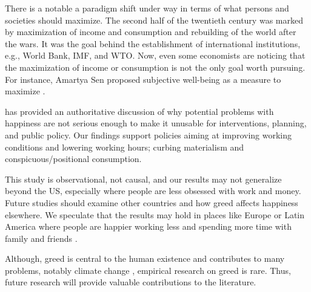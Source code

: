\documentclass[10pt, letterpaper]{article}
\begin{document}
\begin{spacing}{1.8}
There is a notable a paradigm shift under way in terms of what persons and
societies should maximize. The second half of the twentieth century was marked
by maximization of income and consumption and rebuilding of the world after the
wars. It was the goal behind the establishment of international institutions,
e.g., World Bank, IMF, and WTO. Now, even some economists are noticing that the maximization of income or consumption is not the only goal worth pursuing. For instance, Amartya Sen proposed subjective well-being as a measure to maximize \citep{stiglitz09al}. 

\citet{diener09} has provided an authoritative  
discussion of why potential problems with happiness are not serious enough to make it unusable for interventions, planning, and public policy.  
%
Our findings support policies aiming at improving working conditions and lowering working hours; curbing materialism and conspicuous/positional consumption. 

This study is observational, not causal, and our results may not generalize beyond the US, especially where people are less obsessed with work and money. 
%
Future studies should examine other countries and how greed affects happiness
elsewhere. We speculate that the results may hold in places like Europe or Latin America where people are happier working less and spending more time with family and friends \citep{valente16,valente15,aokditella}.  

Although, greed is central to the human existence and contributes to many problems, notably climate change \citep[e.g.,][]{okulicz19}, empirical research on greed is rare. Thus, future research will provide valuable contributions to the literature. 



\end{spacing}
\end{document}
